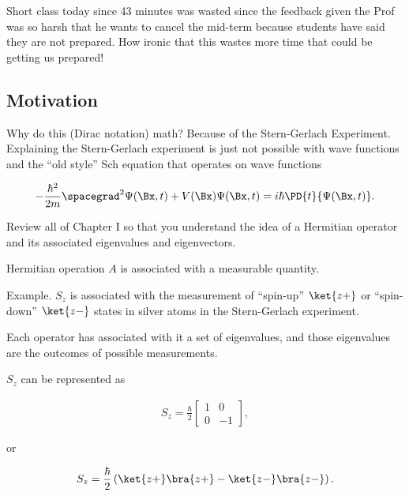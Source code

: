 %
%

Short class today since 43 minutes was wasted since the feedback given the Prof was so harsh that he wants to cancel the mid-term because students have said they are not prepared.  How ironic that this wastes more time that could be getting us prepared!

\subsection{Motivation}

Why do this (Dirac notation) math?  Because of the Stern-Gerlach Experiment.  Explaining the Stern-Gerlach experiment is just not possible with wave functions and the ``old style'' Sch equation that operates on wave functions

\begin{align}\label{eqn:PHY356Foct26:100}
- \frac{\hbar^2}{2m} \spacegrad^2 \Psi(\Bx,t) + V(\Bx) \Psi(\Bx,t) = i \hbar \PD{t}{\Psi(\Bx,t)}.
\end{align}

Review all of Chapter I so that you understand the idea of a Hermitian operator and its associated eigenvalues and eigenvectors.

Hermitian operation $A$ is associated with a measurable quantity.

Example.  $S_z$ is associated with the measurement of ``spin-up'' $\ket{z+}$ or ``spin-down'' $\ket{z-}$ states in silver atoms in the Stern-Gerlach experiment.

Each operator has associated with it a set of eigenvalues, and those eigenvalues are the outcomes of possible measurements.

$S_z$ can be represented as

\begin{align}\label{eqn:PHY356Foct26:101}
S_z = \frac{\hbar}{2}
\begin{bmatrix}
1 & 0 \\
0 & -1
\end{bmatrix},
\end{align}

or

\begin{align}\label{eqn:PHY356Foct26:102}
S_z = \frac{\hbar}{2}
\left( \ket{z+}\bra{z+} - \ket{z-}\bra{z-} \right).
\end{align}

